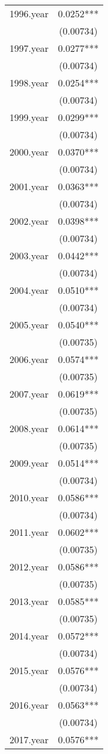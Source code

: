 \documentclass[]{article}
\begin{document}
\begin{tabular}{lc}
1996.year & 0.0252*** \\
 & (0.00734) \\
1997.year & 0.0277*** \\
 & (0.00734) \\
1998.year & 0.0254*** \\
 & (0.00734) \\
1999.year & 0.0299*** \\
 & (0.00734) \\
2000.year & 0.0370*** \\
 & (0.00734) \\
2001.year & 0.0363*** \\
 & (0.00734) \\
2002.year & 0.0398*** \\
 & (0.00734) \\
2003.year & 0.0442*** \\
 & (0.00734) \\
2004.year & 0.0510*** \\
 & (0.00734) \\
2005.year & 0.0540*** \\
 & (0.00735) \\
2006.year & 0.0574*** \\
 & (0.00735) \\
2007.year & 0.0619*** \\
 & (0.00735) \\
2008.year & 0.0614*** \\
 & (0.00735) \\
2009.year & 0.0514*** \\
 & (0.00734) \\
2010.year & 0.0586*** \\
 & (0.00734) \\
2011.year & 0.0602*** \\
 & (0.00735) \\
2012.year & 0.0586*** \\
 & (0.00735) \\
2013.year & 0.0585*** \\
 & (0.00735) \\
2014.year & 0.0572*** \\
 & (0.00734) \\
2015.year & 0.0576*** \\
 & (0.00734) \\
2016.year & 0.0563*** \\
 & (0.00734) \\
2017.year & 0.0576*** \\

\end{tabular}
\end{document}
